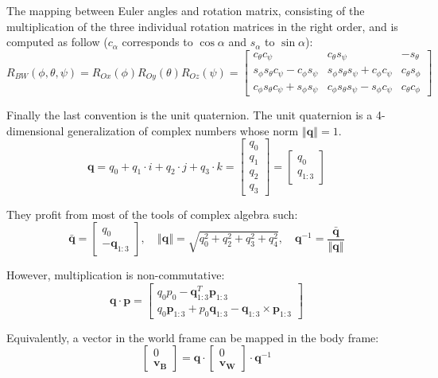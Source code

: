 \documentclass[a4paper, 12pt]{report}
\begin{document}
The mapping between Euler angles and rotation matrix, consisting of the multiplication of the three individual rotation matrices in the right order, and is computed as follow ($c_\alpha$ corresponds to $\cos{\alpha}$ and $s_\alpha$ to $\sin{\alpha}$):
\[R_{BW}(\phi, \theta, \psi)= R_{Ox}(\phi) R_{Oy}(\theta) R_{Oz}(\psi)  = 
\begin{bmatrix}  c_\theta c_\psi  & c_\theta s_\psi  & -s_\theta  \\ s_\phi s_\theta c_\psi -c_\phi s_\psi  & s_\phi s_\theta s_\psi  + c_\phi c_\psi  & c_\theta s_\phi  \\ c_\phi s_\theta c_\psi +s_\phi s_\psi  & c_\phi s_\theta s_\psi -s_\phi c_\psi  & c_\theta c_\phi  \end{bmatrix} \]

Finally the last convention is the unit quaternion. The unit quaternion is a 4-dimensional generalization of complex numbers whose norm $\left\Vert \boldsymbol{q}\right\Vert = 1$.
\[ \boldsymbol{q} =  q_0 + q_1 \cdot i + q_2 \cdot j + q_3 \cdot k = \begin{bmatrix} q_0 \\ q_1 \\ q_2 \\ q_3 \end{bmatrix} = \begin{bmatrix} q_0 \\ q_{1:3} \end{bmatrix} \]

They profit from most of the tools of complex algebra such:
\[ \boldsymbol{\bar q} = \begin{bmatrix} q_0 \\ -\boldsymbol{q}_{1:3} \end{bmatrix},  \quad \left\Vert \boldsymbol{q}\right\Vert = \sqrt{q_0^2 + q_2^2 + q_3^2 + q_4^2}, \quad \boldsymbol{q}^{-1} = \frac{\boldsymbol{\bar q}}{  \left\Vert \boldsymbol{q}\right\Vert} \]

However, multiplication is non-commutative:
\[\boldsymbol{q} \cdot \boldsymbol{p} = \begin{bmatrix} q_0p_0 - \boldsymbol{q}^T_{1:3}\boldsymbol{p}_{1:3} \\ q_0\boldsymbol{p}_{1:3} + p_0\boldsymbol{q}_{1:3} - \boldsymbol{q}_{1:3} \times \boldsymbol{p}_{1:3} \end{bmatrix} \]

Equivalently, a vector in the world frame can be mapped in the body frame:
\[ \begin{bmatrix} 0 \\ \boldsymbol{v_B} \end{bmatrix}  = \boldsymbol{q} \cdot \begin{bmatrix} 0 \\ \boldsymbol{v_W} \end{bmatrix} \cdot \boldsymbol{q}^{-1} \]
\end{document}
